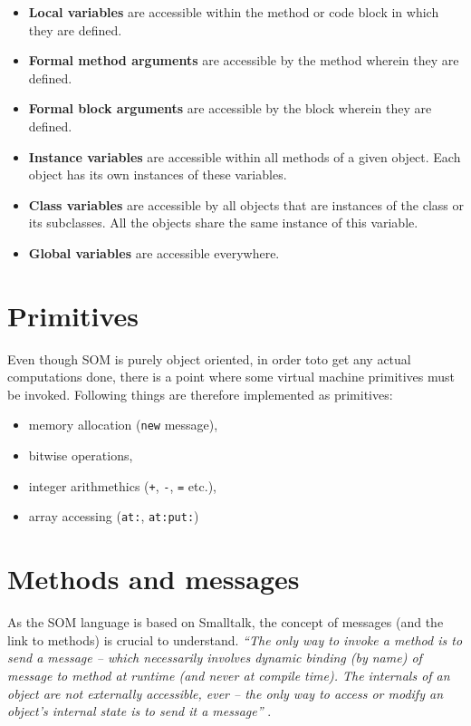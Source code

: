 \documentclass[thesis=M,english]{FITthesis}[2019/12/23]
\begin{document}
\begin{itemize}
	\item \textbf{Local variables} are accessible within the method or code block in which they are defined.
	\item \textbf{Formal method arguments} are accessible by the method wherein they are defined.
	\item \textbf{Formal block arguments} are accessible by the block wherein they are defined.
	\item \textbf{Instance variables} are accessible within all methods of a given object. Each object
		has its own instances of these variables.
	\item \textbf{Class variables} are accessible by all objects that are instances of the class or its
		subclasses. All the objects share the same instance of this variable.
	\item \textbf{Global variables} are accessible everywhere.
\end{itemize}



\section{Primitives}
Even though SOM is purely object oriented, in order toto get any actual computations done, there is a point where
some virtual machine primitives must be invoked. Following things are therefore implemented as primitives:
\begin{itemize}
	\item memory allocation (\texttt{new} message),
	\item bitwise operations,
	\item integer arithmethics (\texttt{+}, \texttt{-}, \texttt{=} etc.),
	\item array accessing (\texttt{at:}, \texttt{at:put:})
\end{itemize}

\section{Methods and messages}
As the SOM language is based on Smalltalk, the concept of messages (and the link to methods) is crucial to understand.
\textit{``The only way to invoke a method is to send a message -- which necessarily involves dynamic binding
(by name) of message to method at runtime (and never at compile time). The internals of an object are not
externally accessible, ever -- the only way to access or modify an object's internal state is to send it
a message''} \cite{smalltalk-essentials}.
\end{document}
